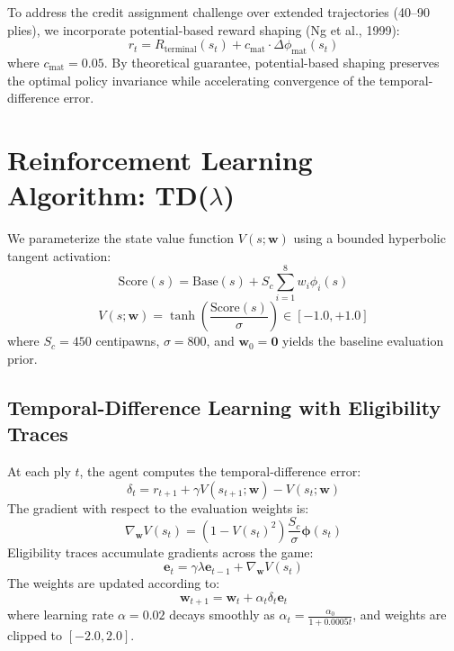 \documentclass[conference,10pt,twocolumn]{IEEEtran}
\begin{document}
To address the credit assignment challenge over extended trajectories (40--90 plies), we incorporate potential-based reward shaping (Ng et al., 1999):
\begin{equation}
r_t = R_{\text{terminal}}(s_t) + c_{\text{mat}} \cdot \Delta \phi_{\text{mat}}(s_t)
\end{equation}
where $c_{\text{mat}} = 0.05$. By theoretical guarantee, potential-based shaping preserves the optimal policy invariance while accelerating convergence of the temporal-difference error.

\section{Reinforcement Learning Algorithm: TD($\lambda$)}
We parameterize the state value function $V(s; \mathbf{w})$ using a bounded hyperbolic tangent activation:
\begin{equation}
\text{Score}(s) = \text{Base}(s) + S_c \sum_{i=1}^8 w_i \phi_i(s)
\end{equation}
\begin{equation}
V(s; \mathbf{w}) = \tanh\left( \frac{\text{Score}(s)}{\sigma} \right) \in [-1.0, +1.0]
\end{equation}
where $S_c = 450$ centipawns, $\sigma = 800$, and $\mathbf{w}_0 = \mathbf{0}$ yields the baseline evaluation prior.

\subsection{Temporal-Difference Learning with Eligibility Traces}
At each ply $t$, the agent computes the temporal-difference error:
\begin{equation}
\delta_t = r_{t+1} + \gamma V(s_{t+1}; \mathbf{w}) - V(s_t; \mathbf{w})
\end{equation}
The gradient with respect to the evaluation weights is:
\begin{equation}
\nabla_{\mathbf{w}} V(s_t) = \left( 1 - V(s_t)^2 \right) \frac{S_c}{\sigma} \boldsymbol{\phi}(s_t)
\end{equation}
Eligibility traces accumulate gradients across the game:
\begin{equation}
\mathbf{e}_t = \gamma \lambda \mathbf{e}_{t-1} + \nabla_{\mathbf{w}} V(s_t)
\end{equation}
The weights are updated according to:
\begin{equation}
\mathbf{w}_{t+1} = \mathbf{w}_t + \alpha_t \delta_t \mathbf{e}_t
\end{equation}
where learning rate $\alpha = 0.02$ decays smoothly as $\alpha_t = \frac{\alpha_0}{1 + 0.0005 t}$, and weights are clipped to $[-2.0, 2.0]$.
\end{document}
